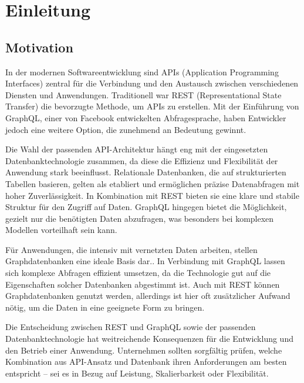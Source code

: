 \chapter{Einleitung} %
\label{sec:einleitung}
\section{Motivation} %
\label{sec:motivation}
In der modernen Softwareentwicklung sind APIs (Application Programming Interfaces) zentral für die Verbindung und den Austausch zwischen verschiedenen Diensten und Anwendungen. Traditionell war REST (Representational State Transfer) die bevorzugte Methode, um APIs zu erstellen. Mit der Einführung von GraphQL, einer von Facebook entwickelten Abfragesprache, haben Entwickler jedoch eine weitere Option, die zunehmend an Bedeutung gewinnt.

\noindent
Die Wahl der passenden API-Architektur hängt eng mit der eingesetzten Datenbanktechnologie zusammen, da diese die Effizienz und Flexibilität der Anwendung stark beeinflusst. Relationale Datenbanken, die auf strukturierten Tabellen basieren, gelten als etabliert und ermöglichen präzise Datenabfragen mit hoher Zuverlässigkeit. In Kombination mit REST bieten sie eine klare und stabile Struktur für den Zugriff auf Daten. GraphQL hingegen bietet die Möglichkeit, gezielt nur die benötigten Daten abzufragen, was besonders bei komplexen Modellen vorteilhaft sein kann.

\noindent
Für Anwendungen, die intensiv mit vernetzten Daten arbeiten, stellen Graphdatenbanken eine ideale Basis dar.. In Verbindung mit GraphQL lassen sich komplexe Abfragen effizient umsetzen, da die Technologie gut auf die Eigenschaften solcher Datenbanken abgestimmt ist. Auch mit REST können Graphdatenbanken genutzt werden, allerdings ist hier oft zusätzlicher Aufwand nötig, um die Daten in eine geeignete Form zu bringen.

\noindent
Die Entscheidung zwischen REST und GraphQL sowie der passenden Datenbanktechnologie hat weitreichende Konsequenzen für die Entwicklung und den Betrieb einer Anwendung. Unternehmen sollten sorgfältig prüfen, welche Kombination aus API-Ansatz und Datenbank ihren Anforderungen am besten entspricht – sei es in Bezug auf Leistung, Skalierbarkeit oder Flexibilität.
\newpage
